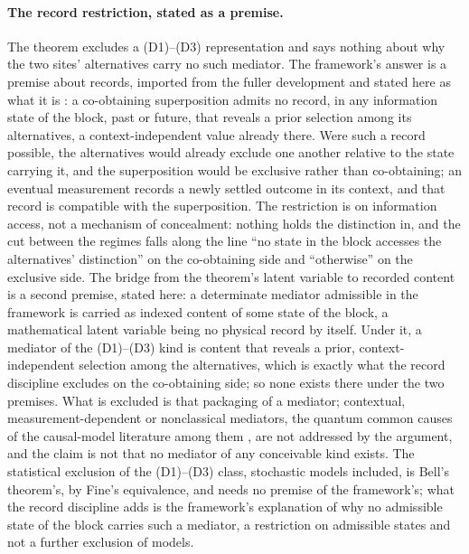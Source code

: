 \documentclass[11pt]{article}
\begin{document}
\paragraph{The record restriction, stated as a premise.} The theorem excludes a (D1)--(D3) representation and says nothing about why the two sites' alternatives carry no such mediator. The framework's answer is a premise about records, imported from the fuller development and stated here as what it is \cite{Aethus}: a co-obtaining superposition admits no record, in any information state of the block, past or future, that reveals a prior selection among its alternatives, a context-independent value already there. Were such a record possible, the alternatives would already exclude one another relative to the state carrying it, and the superposition would be exclusive rather than co-obtaining; an eventual measurement records a newly settled outcome in its context, and that record is compatible with the superposition. The restriction is on information access, not a mechanism of concealment: nothing holds the distinction in, and the cut between the regimes falls along the line ``no state in the block accesses the alternatives' distinction'' on the co-obtaining side and ``otherwise'' on the exclusive side. The bridge from the theorem's latent variable to recorded content is a second premise, stated here: a determinate mediator admissible in the framework is carried as indexed content of some state of the block, a mathematical latent variable being no physical record by itself. Under it, a mediator of the (D1)--(D3) kind is content that reveals a prior, context-independent selection among the alternatives, which is exactly what the record discipline excludes on the co-obtaining side; so none exists there under the two premises. What is excluded is that packaging of a mediator; contextual, measurement-dependent or nonclassical mediators, the quantum common causes of the causal-model literature among them \cite{allen2017quantum}, are not addressed by the argument, and the claim is not that no mediator of any conceivable kind exists. The statistical exclusion of the (D1)--(D3) class, stochastic models included, is Bell's theorem's, by Fine's equivalence, and needs no premise of the framework's; what the record discipline adds is the framework's explanation of why no admissible state of the block carries such a mediator, a restriction on admissible states and not a further exclusion of models.
\end{document}
